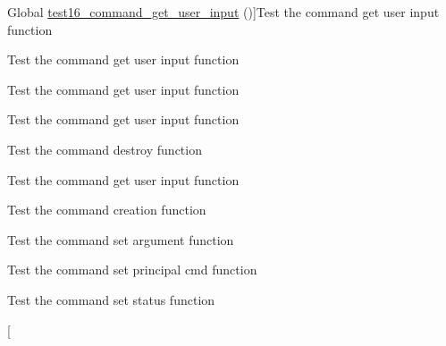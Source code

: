 \begin{DoxyRefList}
Global \hyperlink{command__test_8c_a9acb10b7ed10138a24190b90358e0583}{test16\+\_\+command\+\_\+get\+\_\+user\+\_\+input} ()]Test the command get user input function  
\item[\label{test__test000041}%
\Hypertarget{test__test000041}%
Global \hyperlink{command__test_8c_a46ab7fb8f1c83596debe331b2c7bfbe0}{test17\+\_\+command\+\_\+get\+\_\+user\+\_\+input} ()]Test the command get user input function  
\item[\label{test__test000042}%
\Hypertarget{test__test000042}%
Global \hyperlink{command__test_8c_a4db087cfa5bf22f248747b748745379f}{test18\+\_\+command\+\_\+get\+\_\+user\+\_\+input} ()]Test the command get user input function  
\item[\label{test__test000043}%
\Hypertarget{test__test000043}%
Global \hyperlink{command__test_8c_a340bc65a10e7f7bdcddcef019bbd5aa7}{test19\+\_\+command\+\_\+get\+\_\+user\+\_\+input} ()]Test the command get user input function  
\item[\label{test__test000023}%
\Hypertarget{test__test000023}%
Global \hyperlink{command__test_8c_aadf731a98e5122e70ede7cdc68ba621f}{test1\+\_\+command\+\_\+destroy} ()]Test the command destroy function  
\item[\label{test__test000025}%
\Hypertarget{test__test000025}%
Global \hyperlink{command__test_8c_a932afa8fb63c9b8ba551d030886ce491}{test1\+\_\+command\+\_\+get\+\_\+user\+\_\+input} ()]Test the command get user input function  
\item[\label{test__test000001}%
\Hypertarget{test__test000001}%
Global \hyperlink{command__test_8c_af91aeb3bc73f994f5214b8954f3c4797}{test1\+\_\+command\+\_\+init} ()]Test the command creation function  
\item[\label{test__test000020}%
\Hypertarget{test__test000020}%
Global \hyperlink{command__test_8c_a88a8e8dddaca55194bd73c4d6796ec9b}{test1\+\_\+command\+\_\+set\+\_\+argument} ()]Test the command set argument function  
\item[\label{test__test000005}%
\Hypertarget{test__test000005}%
Global \hyperlink{command__test_8c_a4e6817b2faaa57ed732eb9a68e671ef1}{test1\+\_\+command\+\_\+set\+\_\+principal\+\_\+cmd} ()]Test the command set principal cmd function  
\item[\label{test__test000017}%
\Hypertarget{test__test000017}%
Global \hyperlink{command__test_8c_a86c724b0ce8b1a19b138fb1cb5dd84e3}{test1\+\_\+command\+\_\+set\+\_\+status} ()]Test the command set status function  
\item[\label{test__test000048}%

\end{DoxyRefList}
